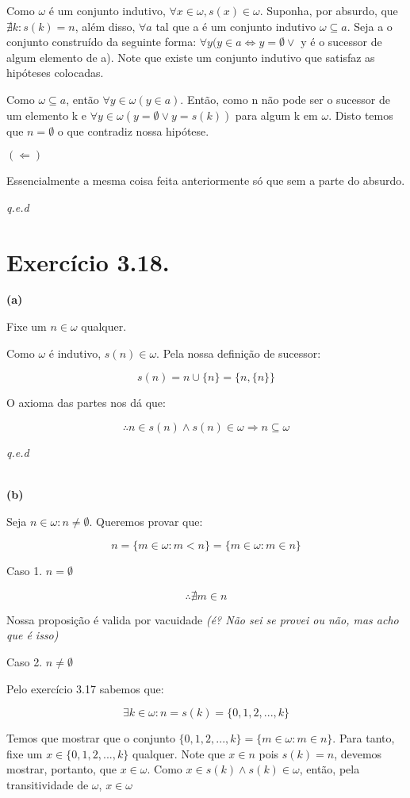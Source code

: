 \documentclass[12pt]{extarticle}
\newcommand{\fim}{\begin{flushright}

   \emph{q.e.d}
\end{flushright}}
\begin{document}
Como $\omega$ é um conjunto indutivo, $\forall x \in \omega, s(x) \in \omega$. Suponha, por absurdo, que $\nexists k : s(k) = n$, além disso, $\forall a$ tal que a é um conjunto indutivo $\omega \subseteq a$. Seja a o conjunto construído da seguinte forma: $\forall y (y \in a \Leftrightarrow y = \emptyset \lor$ y é o sucessor de algum elemento de a). Note que existe um conjunto indutivo que satisfaz as hipóteses colocadas. 

Como $\omega \subseteq a$, então $\forall y \in \omega (y \in a)$. Então, como n não pode ser o sucessor de um elemento k e $\forall y \in \omega (y = \emptyset \lor y = s(k))$ para algum k em $\omega$. Disto temos que $n = \emptyset$ o que contradiz nossa hipótese.

$(\Leftarrow)$ 

Essencialmente a mesma coisa feita anteriormente só que sem a parte do absurdo.

\fim

\section{Exercício 3.18.}

\textbf{(a)}

Fixe um $n \in \omega$ qualquer.

Como $\omega$ é indutivo, $s(n) \in \omega$. Pela nossa definição de sucessor:

$$
s(n) = n \cup \{n\} = \{n ,\{n\}\}
$$

O axioma das partes nos dá que:

$$
\therefore n \in s(n) \land s(n) \in \omega \Rightarrow n \subseteq \omega
$$
\fim
\\
\textbf{(b)}

Seja $n \in \omega : n \neq \emptyset$. Queremos provar que:

$$
n = \{m \in \omega : m < n \} = \{m \in \omega: m \in n\}
$$

Caso 1. $n = \emptyset$

$$
\therefore \nexists m \in n
$$

Nossa proposição é valida por vacuidade \textit{(é? Não sei se provei ou não, mas acho que é isso)}

Caso 2. $n \neq \emptyset$

Pelo exercício 3.17 sabemos que:

$$
\exists k \in \omega : n = s(k) = \{0,1,2,...,k\}
$$

Temos que mostrar que o conjunto $\{0,1,2,...,k\} = \{m \in \omega : m \in n\}$. Para tanto, fixe um $x \in \{0,1,2,...,k\}$ qualquer. Note que $x \in n$ pois $s(k) = n$, devemos mostrar, portanto, que $x \in \omega$. Como $x \in s(k) \land s(k) \in \omega$, então, pela transitividade de $\omega$, $x \in \omega$
\end{document}
